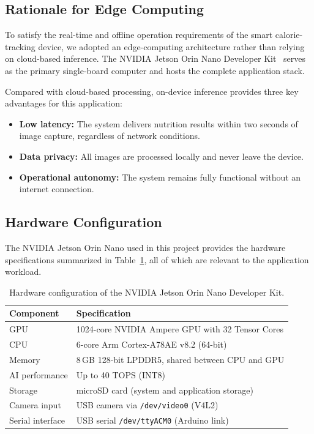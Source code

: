 \documentclass[11pt,a4paper]{article}
\begin{document}
\subsection{Rationale for Edge Computing}

To satisfy the real-time and offline operation requirements of the smart calorie-tracking device, we adopted an edge-computing architecture rather than relying on cloud-based inference. The NVIDIA Jetson Orin Nano Developer Kit~\cite{jetson} serves as the primary single-board computer and hosts the complete application stack.

Compared with cloud-based processing, on-device inference provides three key advantages for this application:

\begin{itemize}
  \item \textbf{Low latency:} The system delivers nutrition results within two seconds of image capture, regardless of network conditions.
  \item \textbf{Data privacy:} All images are processed locally and never leave the device.
  \item \textbf{Operational autonomy:} The system remains fully functional without an internet connection.
\end{itemize}

\subsection{Hardware Configuration}

The NVIDIA Jetson Orin Nano used in this project provides the hardware specifications summarized in Table~\ref{tab:jetson}, all of which are relevant to the application workload.

\begin{table}[H]
  \centering
  \caption{Hardware configuration of the NVIDIA Jetson Orin Nano Developer Kit.}
  \label{tab:jetson}
  \begin{tabular}{ll}
    \toprule
    \textbf{Component} & \textbf{Specification} \\
    \midrule
    GPU              & 1024-core NVIDIA Ampere GPU with 32 Tensor Cores \\
    CPU              & 6-core Arm Cortex-A78AE v8.2 (64-bit) \\
    Memory           & 8\,GB 128-bit LPDDR5, shared between CPU and GPU \\
    AI performance   & Up to 40 TOPS (INT8) \\
    Storage          & microSD card (system and application storage) \\
    Camera input     & USB camera via \texttt{/dev/video0} (V4L2) \\
    Serial interface & USB serial \texttt{/dev/ttyACM0} (Arduino link) \\
    \bottomrule
  \end{tabular}
\end{table}
\end{document}
